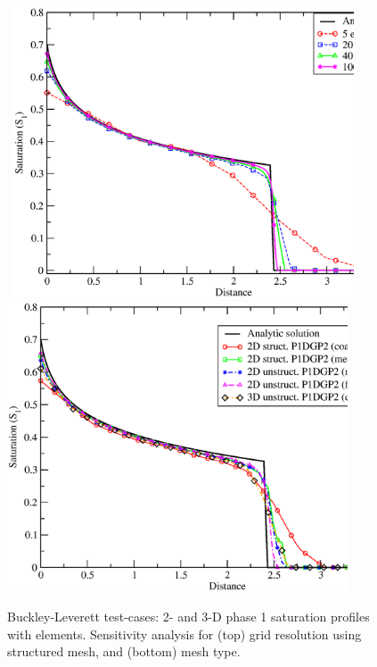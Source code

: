 \begin{figure}[h]
\vbox{\hbox{\hspace{.3cm}
    \includegraphics[width=0.9\textwidth]{./diagrams/BL_2d_P1DGP2_convergence.eps}}
\vspace{-.0cm}\hbox{\hspace{.3cm}
    \includegraphics[width=0.9\textwidth]{./diagrams/simulations_2d_3d.eps}}}
    \caption{Buckley-Leverett test-cases: 2- and 3-D phase 1 saturation profiles with  elements. Sensitivity analysis for (top) grid resolution using structured  mesh, and (bottom) mesh type.\label{fig:BL_2d_profiles}}
\end{figure}




